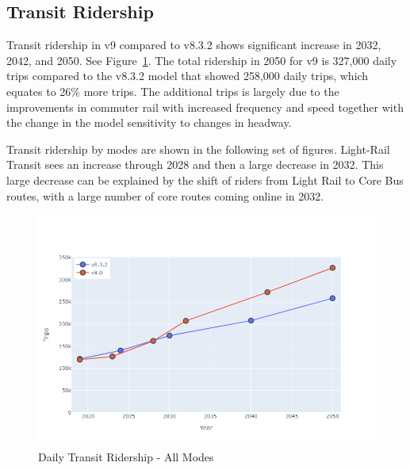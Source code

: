 \documentclass[
  letterpaper,
  DIV=11,
  numbers=noendperiod,
  titlepage=false]{scrreprt}
\begin{document}
\hypertarget{transit-ridership}{%
\subsection{Transit Ridership}\label{transit-ridership}}

Transit ridership in v9 compared to v8.3.2 shows significant increase in
2032, 2042, and 2050. See Figure~\ref{fig-pdf-hy-tr-all}. The total
ridership in 2050 for v9 is 327,000 daily trips compared to the v8.3.2
model that showed 258,000 daily trips, which equates to 26\% more trips.
The additional trips is largely due to the improvements in commuter rail
with increased frequency and speed together with the change in the model
sensitivity to changes in headway.

Transit ridership by modes are shown in the following set of figures.
Light-Rail Transit sees an increase through 2028 and then a large
decrease in 2032. This large decrease can be explained by the shift of
riders from Light Rail to Core Bus routes, with a large number of core
routes coming online in 2032.

\begin{figure}[H]

{\centering \includegraphics{v9x/v900/whats-new/_pictures/pdf-hy-tr-all.png}

}

\caption{\label{fig-pdf-hy-tr-all}Daily Transit Ridership - All Modes}

\end{figure}
\end{document}
